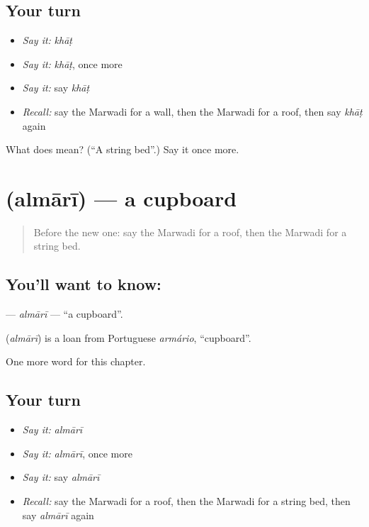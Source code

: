 \subsection*{Your turn}
\begin{itemize}
\raggedright
  \item \emph{Say it:} \emph{khāṭ}
  \item \emph{Say it:} \emph{khāṭ}, once more
  \item \emph{Say it:} say \emph{khāṭ}
  \item \emph{Recall:} say the Marwadi for a wall, then the Marwadi for a roof, then say \emph{khāṭ} again
\end{itemize}

\begin{tcolorbox}[breakable,colback=teal!4,colframe=teal!35!black,title={Before you move on}]
What does  mean? (\textquotedblleft{}A string bed\textquotedblright{}.) Say it once more.
\end{tcolorbox}
\section[\texorpdfstring{\mw{अलमारी} (almārī)}{अलमारी (almārī)}]{ (almārī) — a cupboard}

\label{lesson:MW-C63-almari}



\begin{quote}
Before the new one: say the Marwadi for a roof, then the Marwadi for a string bed.
\end{quote}

\subsection*{You'll want to know: }
\textbf{} — \emph{almārī} — \textquotedblleft{}a cupboard\textquotedblright{}.

\begin{cousinweb}
\textbf{} (\emph{almārī}) is a loan from Portuguese \emph{armário}, \textquotedblleft{}cupboard\textquotedblright{}.
\end{cousinweb}

\begin{grammarlens}[title={What you've built}]
One more word for this chapter.
\end{grammarlens}

\subsection*{Your turn}
\begin{itemize}
\raggedright
  \item \emph{Say it:} \emph{almārī}
  \item \emph{Say it:} \emph{almārī}, once more
  \item \emph{Say it:} say \emph{almārī}
  \item \emph{Recall:} say the Marwadi for a roof, then the Marwadi for a string bed, then say \emph{almārī} again
\end{itemize}

